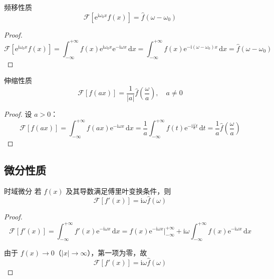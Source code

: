 \begin{dingli}{}{频移性质}
\begin{equation}
    \mathcal{F}[\mathrm{e}^{\mathrm{i}\omega_0 x}f(x)] = \hat{f}(\omega - \omega_0)
\end{equation}
\end{dingli}

\begin{proof}
\begin{equation}
    \mathcal{F}[\mathrm{e}^{\mathrm{i}\omega_0 x}f(x)] = \int_{-\infty}^{+\infty} f(x)\mathrm{e}^{\mathrm{i}\omega_0 x}\mathrm{e}^{-\mathrm{i}\omega x}\,\mathrm{d}x = \int_{-\infty}^{+\infty} f(x)\mathrm{e}^{-\mathrm{i}(\omega-\omega_0) x}\,\mathrm{d}x = \hat{f}(\omega - \omega_0)
\end{equation}
\end{proof}
\begin{dingli}{}{伸缩性质}
\begin{equation}
    \mathcal{F}[f(ax)] = \frac{1}{|a|}\hat{f}\left(\frac{\omega}{a}\right), \quad a \neq 0
\end{equation}
\end{dingli}

\begin{proof}
设 $a > 0$：
\begin{equation}
    \mathcal{F}[f(ax)] = \int_{-\infty}^{+\infty} f(ax)\mathrm{e}^{-\mathrm{i}\omega x}\,\mathrm{d}x = \frac{1}{a}\int_{-\infty}^{+\infty} f(t)\mathrm{e}^{-\mathrm{i}\frac{\omega}{a}t}\,\mathrm{d}t = \frac{1}{a}\hat{f}\left(\frac{\omega}{a}\right)
\end{equation}
\end{proof}

\subsection{微分性质}

\begin{dingli}{}{时域微分}
若 $f(x)$ 及其导数满足傅里叶变换条件，则
\begin{equation}
    \mathcal{F}[f'(x)] = \mathrm{i}\omega\hat{f}(\omega)
\end{equation}
\end{dingli}

\begin{proof}
\begin{equation}
    \mathcal{F}[f'(x)] = \int_{-\infty}^{+\infty} f'(x)\mathrm{e}^{-\mathrm{i}\omega x}\,\mathrm{d}x = f(x)\mathrm{e}^{-\mathrm{i}\omega x}\Big|_{-\infty}^{+\infty} + \mathrm{i}\omega\int_{-\infty}^{+\infty} f(x)\mathrm{e}^{-\mathrm{i}\omega x}\,\mathrm{d}x
\end{equation}

由于 $f(x) \to 0$（$|x| \to \infty$），第一项为零，故
\begin{equation}
    \mathcal{F}[f'(x)] = \mathrm{i}\omega\hat{f}(\omega)
\end{equation}
\end{proof}

